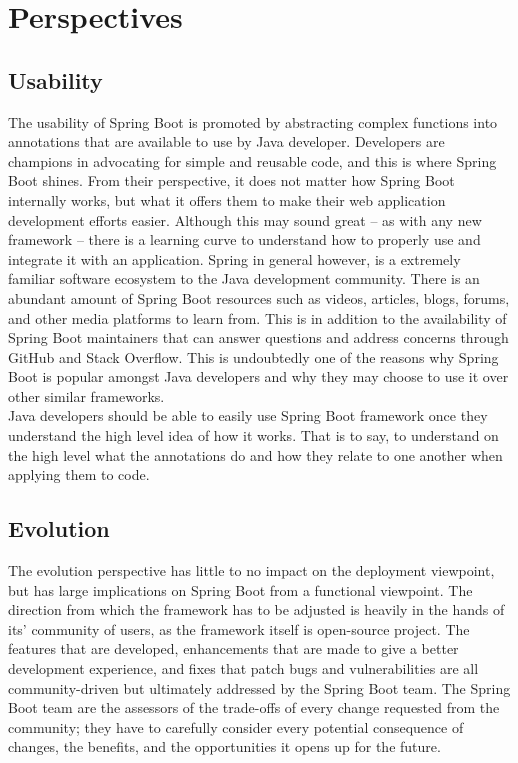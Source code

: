 \section{Perspectives}

\subsection{Usability}
The usability of Spring Boot is promoted by abstracting complex functions into annotations that are available to use by Java developer. Developers are champions in advocating for simple and reusable code, and this is where Spring Boot shines. From their perspective, it does not matter how Spring Boot internally works, but what it offers them to make their web application development efforts easier. Although this may sound great -- as with any new framework -- there is a learning curve to understand how to properly use and integrate it with an application. Spring in general however, is a extremely familiar software ecosystem to the Java development community. There is an abundant amount of Spring Boot resources such as videos, articles, blogs, forums, and other media platforms to learn from. This is in addition to the availability of Spring Boot maintainers that can answer questions and address concerns through GitHub and Stack Overflow. This is undoubtedly one of the reasons why Spring Boot is popular amongst Java developers and why they may choose to use it over other similar frameworks.\\

Java developers should be able to easily use Spring Boot framework once they understand the high level idea of how it works. That is to say, to understand on the high level what the annotations do and how they relate to one another when applying them to code.

\subsection{Evolution}
The evolution perspective has little to no impact on the deployment viewpoint, but has large implications on Spring Boot from a functional viewpoint. The direction from which the framework has to be adjusted is heavily in the hands of its' community of users, as the framework itself is open-source project. The features that are developed, enhancements that are made to give a better development experience, and fixes that patch bugs and vulnerabilities are all community-driven but ultimately addressed by the Spring Boot team. The Spring Boot team are the assessors of the trade-offs of every change requested from the community; they have to carefully consider every potential consequence of changes, the benefits, and the opportunities it opens up for the future.\\

